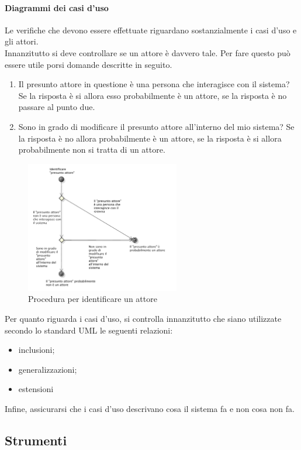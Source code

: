 			\paragraph{Diagrammi dei casi d'uso}
				Le verifiche che devono essere effettuate riguardano sostanzialmente i casi d'uso e gli attori.\\
				Innanzitutto si deve controllare se un attore è davvero tale. Per fare questo può essere utile porsi domande descritte in seguito.
				\begin{enumerate}
					\item Il presunto attore in questione è una persona che interagisce con il sistema? Se la risposta è si allora esso probabilmente 
					è un attore, se la risposta è no passare al punto due.
					\item Sono in grado di modificare il presunto attore all'interno del mio sistema? Se la risposta è no allora probabilmente è un attore, 
					se la risposta è si allora probabilmente non si tratta di un attore.
				\end{enumerate}
				\begin{figure}[H]
					\centering
					\includegraphics[width=0.6\textwidth]{NormeDiProgetto/Pics/VerificaAttori}
					\caption{Procedura per identificare un attore}
				\end{figure}
				Per quanto riguarda i casi d'uso, si controlla innanzitutto che siano utilizzate secondo lo standard UML le seguenti relazioni:
				\begin{itemize}
					\item inclusioni;
					\item generalizzazioni;
					\item estensioni
				\end{itemize}
				Infine, assicurarsi che i casi d'uso descrivano cosa il sistema fa e non cosa non fa.
	\subsection{Strumenti}
		